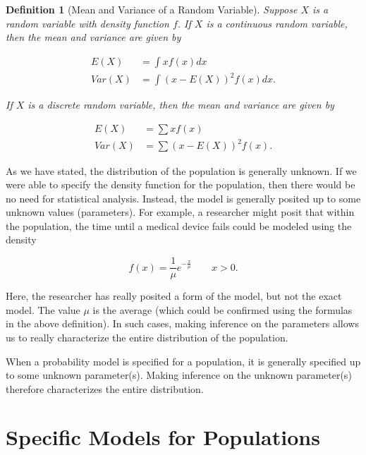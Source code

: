 \documentclass[
]{book}
\theoremstyle{plain}
\theoremstyle{mydefn}
\newtheorem{definition}{Definition}[chapter]
\theoremstyle{myexmpl}
\theoremstyle{remark}
\begin{document}
\begin{definition}[Mean and Variance of a Random Variable]
\protect\hypertarget{def:defn-rv-mean-variance}{}{\label{def:defn-rv-mean-variance} {} }Suppose \(X\) is a random variable with density function \(f\). If \(X\) is a continuous random variable, then the mean and variance are given by

\[
\begin{aligned}
  E(X) &= \int x f(x) dx \\
  Var(X) &= \int \left(x - E(X)\right)^2 f(x) dx.
\end{aligned}
\]

If \(X\) is a discrete random variable, then the mean and variance are given by

\[
\begin{aligned}
  E(X) &= \sum x f(x) \\
  Var(X) &= \sum \left(x - E(X)\right)^2 f(x).
\end{aligned}
\]
\end{definition}

As we have stated, the distribution of the population is generally unknown. If we were able to specify the density function for the population, then there would be no need for statistical analysis. Instead, the model is generally posited up to some unknown values (parameters). For example, a researcher might posit that within the population, the time until a medical device fails could be modeled using the density

\[f(x) = \frac{1}{\mu} e^{-\frac{x}{\mu}} \qquad x > 0.\]

Here, the researcher has really posited a form of the model, but not the exact model. The value \(\mu\) is the average (which could be confirmed using the formulas in the above definition). In such cases, making inference on the parameters allows us to really characterize the entire distribution of the population.

\begin{rmdkeyidea}
When a probability model is specified for a population, it is generally specified up to some unknown parameter(s). Making inference on the unknown parameter(s) therefore characterizes the entire distribution.
\end{rmdkeyidea}

\hypertarget{specific-models-for-populations}{%
\section{Specific Models for Populations}\label{specific-models-for-populations}}
\end{document}
